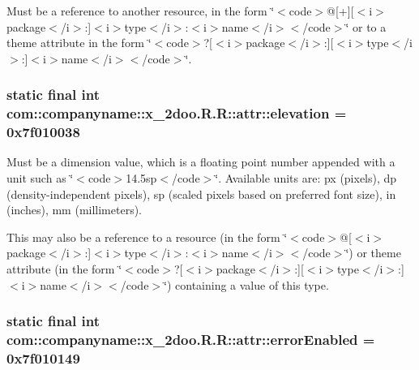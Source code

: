 Must be a reference to another resource, in the form \char`\"{}$<$code$>$@\mbox{[}+\mbox{]}\mbox{[}$<$i$>$package$<$/i$>$:\mbox{]}$<$i$>$type$<$/i$>$:$<$i$>$name$<$/i$>$$<$/code$>$\char`\"{} or to a theme attribute in the form \char`\"{}$<$code$>$?\mbox{[}$<$i$>$package$<$/i$>$:\mbox{]}\mbox{[}$<$i$>$type$<$/i$>$:\mbox{]}$<$i$>$name$<$/i$>$$<$/code$>$\char`\"{}. \hypertarget{classcom_1_1companyname_1_1x__2doo_1_1_r_1_1attr_3661b6445a2b19a2dca2157df91648d2}{
\subsubsection[{elevation}]{\setlength{\rightskip}{0pt plus 5cm}static final int com::companyname::x\_\-2doo.R.R::attr::elevation = 0x7f010038}}
\label{classcom_1_1companyname_1_1x__2doo_1_1_r_1_1attr_3661b6445a2b19a2dca2157df91648d2}


Must be a dimension value, which is a floating point number appended with a unit such as \char`\"{}$<$code$>$14.5sp$<$/code$>$\char`\"{}. Available units are: px (pixels), dp (density-independent pixels), sp (scaled pixels based on preferred font size), in (inches), mm (millimeters). 

This may also be a reference to a resource (in the form \char`\"{}$<$code$>$@\mbox{[}$<$i$>$package$<$/i$>$:\mbox{]}$<$i$>$type$<$/i$>$:$<$i$>$name$<$/i$>$$<$/code$>$\char`\"{}) or theme attribute (in the form \char`\"{}$<$code$>$?\mbox{[}$<$i$>$package$<$/i$>$:\mbox{]}\mbox{[}$<$i$>$type$<$/i$>$:\mbox{]}$<$i$>$name$<$/i$>$$<$/code$>$\char`\"{}) containing a value of this type. \hypertarget{classcom_1_1companyname_1_1x__2doo_1_1_r_1_1attr_29b4019563d2396aa0851e063ee4d087}{
\subsubsection[{errorEnabled}]{\setlength{\rightskip}{0pt plus 5cm}static final int com::companyname::x\_\-2doo.R.R::attr::errorEnabled = 0x7f010149}}
\label{classcom_1_1companyname_1_1x__2doo_1_1_r_1_1attr_29b4019563d2396aa0851e063ee4d087}


